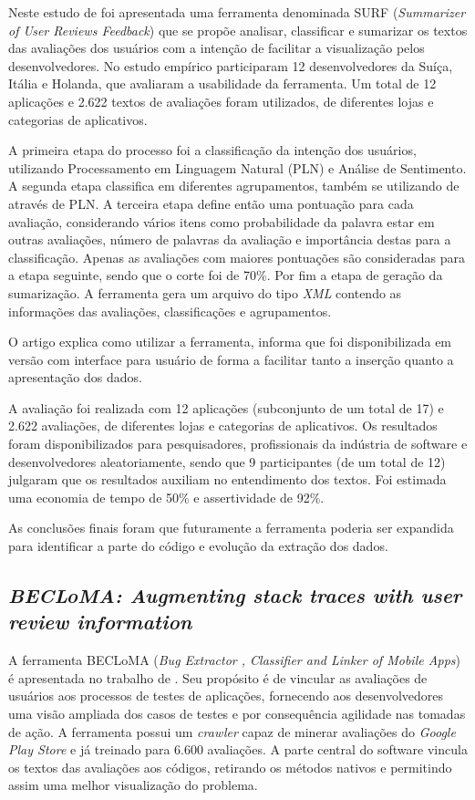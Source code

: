 Neste estudo de  foi apresentada uma ferramenta denominada SURF (\textit{Summarizer of User Reviews Feedback}) que se propõe analisar, classificar e sumarizar os textos das avaliações dos usuários com a intenção de facilitar a visualização pelos desenvolvedores. No estudo empírico participaram 12 desenvolvedores da Suíça, Itália e Holanda, que avaliaram a usabilidade da ferramenta. Um total de 12 aplicações e 2.622 textos de avaliações foram utilizados, de diferentes lojas e categorias de aplicativos.

A primeira etapa do processo foi a classificação da intenção dos usuários, utilizando Processamento em Linguagem Natural (PLN) e Análise de Sentimento.
A segunda etapa classifica em diferentes agrupamentos, também se utilizando de através de PLN.
A terceira etapa define então uma pontuação para cada avaliação, considerando vários itens como probabilidade da palavra estar em outras avaliações, número de palavras da avaliação e importância destas para a classificação. Apenas as avaliações com maiores pontuações são consideradas para a etapa seguinte, sendo que o corte foi de 70\%.
Por fim a etapa de geração da sumarização. A ferramenta gera um arquivo do tipo \textit{XML} contendo as informações das avaliações, classificações e agrupamentos.

O artigo explica como utilizar a ferramenta, informa que foi disponibilizada em versão com interface para usuário de forma a facilitar tanto a inserção quanto a apresentação dos dados. 

A avaliação foi realizada com 12 aplicações (subconjunto de um total de 17) e 2.622 avaliações, de diferentes lojas e categorias de aplicativos.
Os resultados foram disponibilizados para pesquisadores, profissionais da indústria de software e desenvolvedores aleatoriamente, sendo que 9 participantes (de um total de 12) julgaram que os resultados auxiliam no entendimento dos textos. Foi estimada uma economia de tempo de 50\% e assertividade de 92\%.

As conclusões finais foram que futuramente a ferramenta poderia ser expandida para identificar a parte do código e evolução da extração dos dados.

\subsection{\textit{BECLoMA: Augmenting stack traces with user review information}}

A ferramenta BECLoMA (\textit{Bug Extractor , Classifier and Linker of Mobile Apps}) é apresentada no trabalho de . Seu propósito é de vincular as avaliações de usuários aos processos de testes de aplicações, fornecendo aos desenvolvedores uma visão ampliada dos casos de testes e por consequência agilidade nas tomadas de ação. A ferramenta possui um \textit{crawler} capaz de minerar avaliações do \textit{Google Play Store} e já treinado para 6.600 avaliações. A parte central do software vincula os textos das avaliações aos códigos, retirando os métodos nativos e permitindo assim uma melhor visualização do problema.

